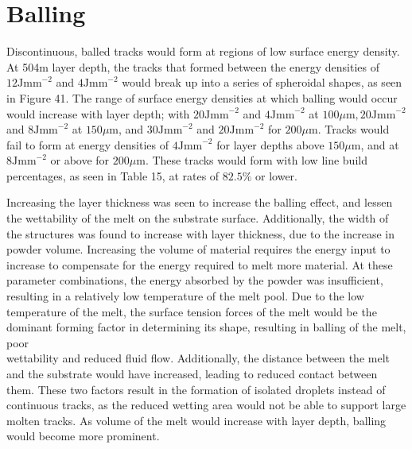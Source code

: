 \documentclass[10pt]{article}
\begin{document}
\section*{Balling}
Discontinuous, balled tracks would form at regions of low surface energy density. At 504m layer depth, the tracks that formed between the energy densities of $12 \mathrm{Jmm}^{-2}$ and $4 \mathrm{Jmm}^{-2}$ would break up into a series of spheroidal shapes, as seen in Figure 41. The range of surface energy densities at which balling would occur would increase with layer depth; with $20 \mathrm{Jmm}^{-2}$ and $4 \mathrm{Jmm}^{-2}$ at $100 \mu \mathrm{m}, 20 \mathrm{Jmm}^{-2}$ and $8 \mathrm{Jmm}^{-2}$ at $150 \mu \mathrm{m}$, and $30 \mathrm{Jmm}^{-2}$ and $20 \mathrm{Jmm}^{-2}$ for $200 \mu \mathrm{m}$. Tracks would fail to form at energy densities of $4 \mathrm{Jmm}^{-2}$ for layer depths above $150 \mu \mathrm{m}$, and at $8 \mathrm{Jmm}^{-2}$ or above for $200 \mu \mathrm{m}$. These tracks would form with low line build percentages, as seen in Table 15, at rates of $82.5 \%$ or lower.

Increasing the layer thickness was seen to increase the balling effect, and lessen the wettability of the melt on the substrate surface. Additionally, the width of the structures was found to increase with layer thickness, due to the increase in powder volume. Increasing the volume of material requires the energy input to increase to compensate for the energy required to melt more material. At these parameter combinations, the energy absorbed by the powder was insufficient, resulting in a relatively low temperature of the melt pool. Due to the low temperature of the melt, the surface tension forces of the melt would be the dominant forming factor in determining its shape, resulting in balling of the melt, poor\\
wettability and reduced fluid flow. Additionally, the distance between the melt and the substrate would have increased, leading to reduced contact between them. These two factors result in the formation of isolated droplets instead of continuous tracks, as the reduced wetting area would not be able to support large molten tracks. As volume of the melt would increase with layer depth, balling would become more prominent.
\end{document}
